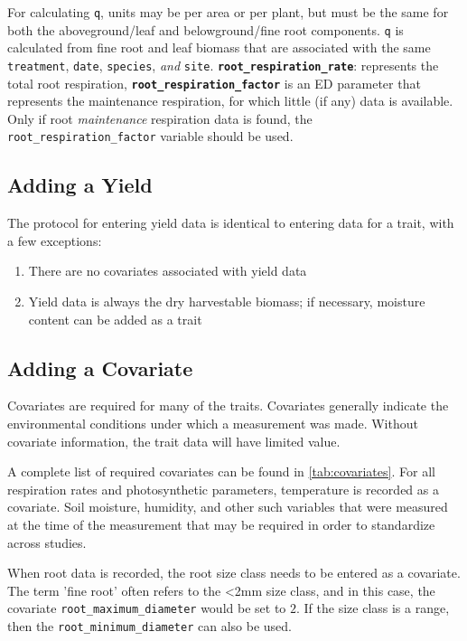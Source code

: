 \documentclass[12pt,english,portrait]{article}
\begin{document}
\begin{table}
{ For calculating \texttt{q}, units may be per area or per plant, but must be the same for both the aboveground/leaf and belowground/fine root components.
 \texttt{q} is calculated from fine root and leaf biomass that are associated with the same \texttt{treatment}, \texttt{date}, \texttt{species}, \emph{and} \texttt{site}.
 \textbf{\texttt{root\_respiration\_rate}}: represents the total root respiration, \textbf{\texttt{root\_respiration\_factor}} is an ED parameter that represents the maintenance respiration, for which little (if any) data is available. Only if root \emph{maintenance} respiration data is found, the \texttt{root\_respiration\_factor} variable should be used.}
  \label{tab:traits}
\end{table}



\subsection{Adding a Yield}

The protocol for entering yield data is identical to entering data for a trait, with a few exceptions:

\begin{enumerate}
\item There are no covariates associated with yield data 
\item Yield data is always the dry harvestable biomass; if necessary, moisture content can be added as a trait
\end{enumerate}

\subsection{Adding a Covariate} 

 Covariates are required for many of the traits.
 Covariates generally indicate the environmental conditions under which a measurement was made.
 Without covariate information, the trait data will have limited value.

 A complete list of required covariates can be found in \autoref{tab:covariates}. 
 For all respiration rates and photosynthetic parameters, temperature is recorded as a covariate. 
 Soil moisture, humidity, and other such variables that were measured at the time of the measurement that may be required in order to standardize across studies.

 When root data is recorded, the root size class needs to be entered as a covariate.
 The term 'fine root' often refers to the <2mm size class, and in this case, the covariate \verb+root_maximum_diameter+ would be set to $2$. 
 If the size class is a range, then the \verb+root_minimum_diameter+ can also be used.
 
\end{document}
